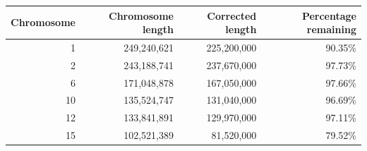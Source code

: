 \begin{table}[!ht]
  \scriptsize
  \begin{center}
    \begin{tabular}{ r r r r }
      \hline
      \textbf{Chromosome} & \textbf{Chromosome length} & \textbf{Corrected length} & \textbf{Percentage remaining} \\ \hline
      1            & 249,240,621         & 225,200,000               & 90.35\%                  \\
      2            & 243,188,741         & 237,670,000               & 97.73\%                  \\
      6            & 171,048,878         & 167,050,000               & 97.66\%                  \\
      10           & 135,524,747         & 131,040,000               & 96.69\%                  \\
      12           & 133,841,891         & 129,970,000               & 97.11\%                  \\
      15           & 102,521,389         & 81,520,000                & 79.52\%                  \\

\end{tabular}
\end{center}
\end{table}
